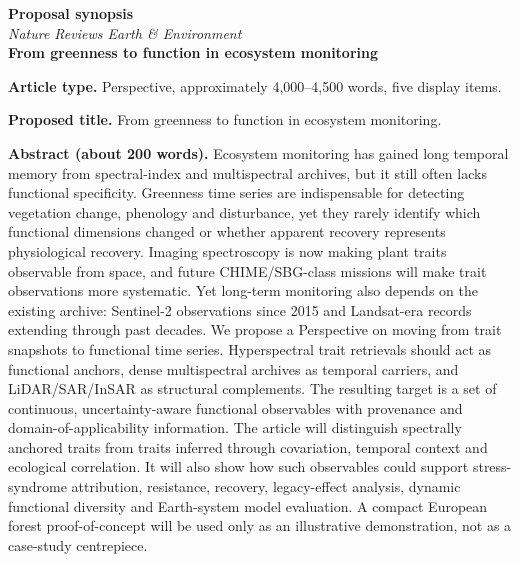 \documentclass[11pt]{article}
\newcommand{\papertitle}{From greenness to function in ecosystem monitoring}
\begin{document}
\begin{center}
{\Large \textbf{Proposal synopsis}}\\[0.25em]
{\large \textit{Nature Reviews Earth \& Environment}}\\[0.45em]
{\large \textbf{\papertitle}}
\end{center}

\textbf{Article type.} Perspective, approximately 4,000--4,500 words, five display items.

\textbf{Proposed title.} \papertitle.

\textbf{Abstract (about 200 words).}
Ecosystem monitoring has gained long temporal memory from spectral-index and multispectral archives, but it still often lacks functional specificity. Greenness time series are indispensable for detecting vegetation change, phenology and disturbance, yet they rarely identify which functional dimensions changed or whether apparent recovery represents physiological recovery. Imaging spectroscopy is now making plant traits observable from space, and future CHIME/SBG-class missions will make trait observations more systematic. Yet long-term monitoring also depends on the existing archive: Sentinel-2 observations since 2015 and Landsat-era records extending through past decades. We propose a Perspective on moving from trait snapshots to functional time series. Hyperspectral trait retrievals should act as functional anchors, dense multispectral archives as temporal carriers, and LiDAR/SAR/InSAR as structural complements. The resulting target is a set of continuous, uncertainty-aware functional observables with provenance and domain-of-applicability information. The article will distinguish spectrally anchored traits from traits inferred through covariation, temporal context and ecological correlation. It will also show how such observables could support stress-syndrome attribution, resistance, recovery, legacy-effect analysis, dynamic functional diversity and Earth-system model evaluation. A compact European forest proof-of-concept will be used only as an illustrative demonstration, not as a case-study centrepiece.
\end{document}
